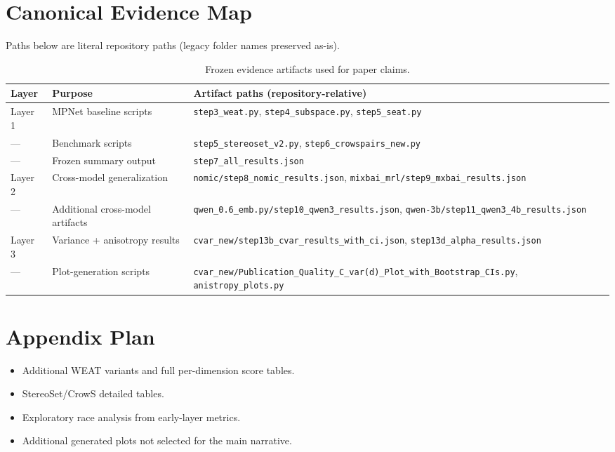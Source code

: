 \documentclass[conference]{IEEEtran}
\begin{document}
\section{Canonical Evidence Map}
\label{sec:evidence}
Paths below are literal repository paths (legacy folder names preserved as-is).
\begin{table}[t]
\caption{Frozen evidence artifacts used for paper claims.}
\centering
\begin{tabular}{lll}
\toprule
Layer & Purpose & Artifact paths (repository-relative) \\
\midrule
Layer 1 & MPNet baseline scripts & \texttt{step3\_weat.py}, \texttt{step4\_subspace.py}, \texttt{step5\_seat.py} \\
--- & Benchmark scripts & \texttt{step5\_stereoset\_v2.py}, \texttt{step6\_crowspairs\_new.py} \\
--- & Frozen summary output & \texttt{step7\_all\_results.json} \\
Layer 2 & Cross-model generalization & \texttt{nomic/step8\_nomic\_results.json}, \texttt{mixbai\_mrl/step9\_mxbai\_results.json} \\
--- & Additional cross-model artifacts & \texttt{qwen\_0.6\_emb.py/step10\_qwen3\_results.json}, \texttt{qwen-3b/step11\_qwen3\_4b\_results.json} \\
Layer 3 & Variance + anisotropy results & \texttt{cvar\_new/step13b\_cvar\_results\_with\_ci.json}, \texttt{step13d\_alpha\_results.json} \\
--- & Plot-generation scripts & \texttt{cvar\_new/Publication\_Quality\_C\_var(d)\_Plot\_with\_Bootstrap\_CIs.py}, \texttt{anistropy\_plots.py} \\
\bottomrule
\end{tabular}
\end{table}

\section*{Appendix Plan}
\begin{itemize}
    \item Additional WEAT variants and full per-dimension score tables.
    \item StereoSet/CrowS detailed tables.
    \item Exploratory race analysis from early-layer metrics.
    \item Additional generated plots not selected for the main narrative.
\end{itemize}
\end{document}
